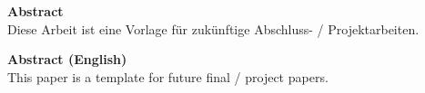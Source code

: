 {\huge{\textbf{Abstract}}}\\

Diese Arbeit ist eine Vorlage für zukünftige Abschluss- / Projektarbeiten.

\clearpage

{\huge{\textbf{Abstract (English)}}}\\

This paper is a template for future final / project papers.
